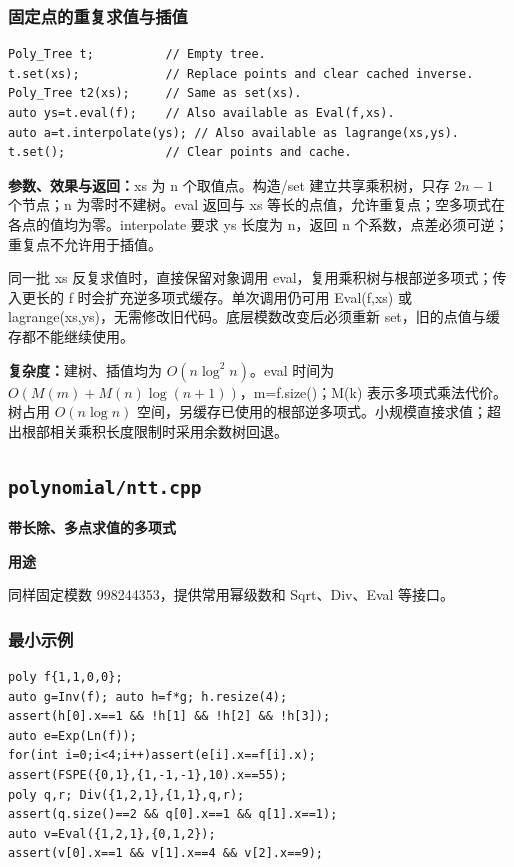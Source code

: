 \documentclass[UTF8,a4paper,10pt]{ctexart}
\newcommand{\TemplUsage}[1]{\textbf{用途}\par #1\par}
\begin{document}
\noindent\begin{minipage}{\textwidth}
\subsubsection*{固定点的重复求值与插值}
\begin{lstlisting}
Poly_Tree t;          // Empty tree.
t.set(xs);            // Replace points and clear cached inverse.
Poly_Tree t2(xs);     // Same as set(xs).
auto ys=t.eval(f);    // Also available as Eval(f,xs).
auto a=t.interpolate(ys); // Also available as lagrange(xs,ys).
t.set();              // Clear points and cache.
\end{lstlisting}
\textbf{参数、效果与返回：}xs 为 n 个取值点。构造/set 建立共享乘积树，只存 $2n-1$ 个节点；n 为零时不建树。eval 返回与 xs 等长的点值，允许重复点；空多项式在各点的值均为零。interpolate 要求 ys 长度为 n，返回 n 个系数，点差必须可逆；重复点不允许用于插值。

同一批 xs 反复求值时，直接保留对象调用 eval，复用乘积树与根部逆多项式；传入更长的 f 时会扩充逆多项式缓存。单次调用仍可用 Eval(f,xs) 或 lagrange(xs,ys)，无需修改旧代码。底层模数改变后必须重新 set，旧的点值与缓存都不能继续使用。

\textbf{复杂度：}建树、插值均为 $O(n\log^2 n)$。eval 时间为 $O(M(m)+M(n)\log(n+1))$，m=f.size()；M(k) 表示多项式乘法代价。树占用 $O(n\log n)$ 空间，另缓存已使用的根部逆多项式。小规模直接求值；超出根部相关乘积长度限制时采用余数树回退。
\end{minipage}\par
\clearpage
\subsection{\texttt{polynomial/ntt.cpp}}
\textbf{带长除、多点求值的多项式}\par
\TemplUsage{同样固定模数 998244353，提供常用幂级数和 Sqrt、Div、Eval 等接口。}
\subsubsection*{最小示例}
\begin{lstlisting}
poly f{1,1,0,0};
auto g=Inv(f); auto h=f*g; h.resize(4);
assert(h[0].x==1 && !h[1] && !h[2] && !h[3]);
auto e=Exp(Ln(f));
for(int i=0;i<4;i++)assert(e[i].x==f[i].x);
assert(FSPE({0,1},{1,-1,-1},10).x==55);
poly q,r; Div({1,2,1},{1,1},q,r);
assert(q.size()==2 && q[0].x==1 && q[1].x==1);
auto v=Eval({1,2,1},{0,1,2});
assert(v[0].x==1 && v[1].x==4 && v[2].x==9);
\end{lstlisting}
\end{document}
